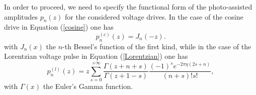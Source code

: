 \documentclass[12pt]{iopart}
\begin{document}
In order to proceed, we need to specify the functional form of the photo-assisted amplitudes $p_{n}(z)$ for the considered voltage drives. In the case of the cosine drive in Equation (\ref{cosine}) one has
\begin{equation}
p^{(c)}_{n}(z) = J_{n} \left(-z\right).
\label{cos}
\end{equation}
with $J_{n}(x)$ the $n$-th Bessel's function of the first kind, while in the case of the Lorentzian voltage pulse in Equation (\ref{Lorentzian}) one has \cite{Grenier13, Dubois13}
\begin{equation}
p^{(l)}_{n}(z) =  z \sum_{s=0}^{+\infty} \frac{\Gamma (z+n+s)}{\Gamma(z+1-s)} \frac{(-1)^s e^{-2 \pi \eta (2s+n)}}{(n+s)! s!},
\label{lor}
\end{equation}
with $\Gamma(x)$ the Euler's Gamma function. 
\end{document}
